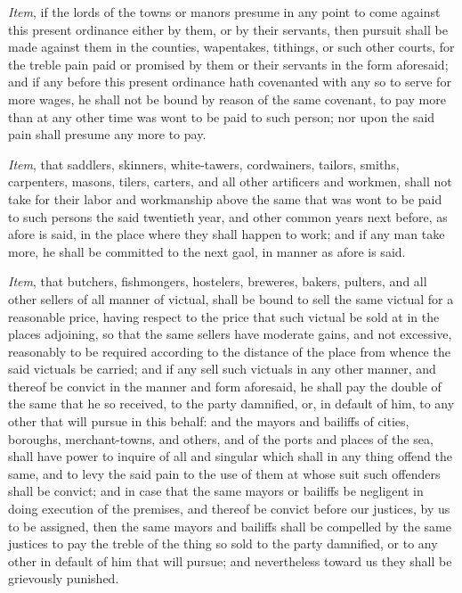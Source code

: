 \documentclass[
  letterpaper,
  11pt,
  DIV=9,
  openright]{scrbook}
\begin{document}
\emph{Item}, if the lords of the towns or manors presume in any point to
come against this present ordinance either by them, or by their
servants, then pursuit shall be made against them in the counties,
wapentakes, tithings, or such other courts, for the treble pain paid or
promised by them or their servants in the form aforesaid; and if any
before this present ordinance hath covenanted with any so to serve for
more wages, he shall not be bound by reason of the same covenant, to pay
more than at any other time was wont to be paid to such person; nor upon
the said pain shall presume any more to pay.


\emph{Item}, that saddlers, skinners, white-tawers, cordwainers,
tailors, smiths, carpenters, masons, tilers, carters, and all other
artificers and workmen, shall not take for their labor and workmanship
above the same that was wont to be paid to such persons the said
twentieth year, and other common years next before, as afore is said, in
the place where they shall happen to work; and if any man take more, he
shall be committed to the next gaol, in manner as afore is said.


\emph{Item}, that butchers, fishmongers, hostelers, breweres, bakers,
pulters, and all other sellers of all manner of victual, shall be bound
to sell the same victual for a reasonable price, having respect to the
price that such victual be sold at in the places adjoining, so that the
same sellers have moderate gains, and not excessive, reasonably to be
required according to the distance of the place from whence the said
victuals be carried; and if any sell such victuals in any other manner,
and thereof be convict in the manner and form aforesaid, he shall pay
the double of the same that he so received, to the party damnified, or,
in default of him, to any other that will pursue in this behalf: and the
mayors and bailiffs of cities, boroughs, merchant-towns, and others, and
of the ports and places of the sea, shall have power to inquire of all
and singular which shall in any thing offend the same, and to levy the
said pain to the use of them at whose suit such offenders shall be
convict; and in case that the same mayors or bailiffs be negligent in
doing execution of the premises, and thereof be convict before our
justices, by us to be assigned, then the same mayors and bailiffs shall
be compelled by the same justices to pay the treble of the thing so sold
to the party damnified, or to any other in default of him that will
pursue; and nevertheless toward us they shall be grievously punished.
\end{document}
